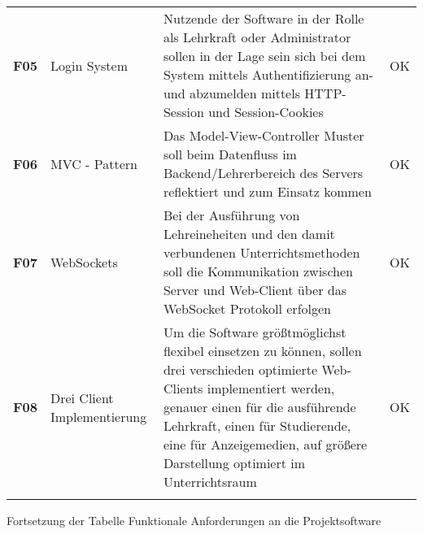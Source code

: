 \begin{table}[h!]
\begin{tabularx}{\textwidth}{clXc}
	\rowcolor[HTML]{FFFFFF}
	\textbf{F05}         & Login System                                              & Nutzende der Software in der Rolle als Lehrkraft oder Administrator sollen in der Lage sein sich bei dem System mittels Authentifizierung an- und abzumelden mittels HTTP-Session und Session-Cookies                                                                                 & OK              \\
	\rowcolor[HTML]{EFEFEF}
	\textbf{F06}         & MVC - Pattern                                             & Das Model-View-Controller Muster soll beim Datenfluss im Backend/Lehrerbereich des Servers reflektiert und zum Einsatz kommen                                                                                                                                                         & OK              \\
	\rowcolor[HTML]{FFFFFF}
	\textbf{F07}         & WebSockets                                                & Bei der Ausführung von Lehreineheiten und den damit verbundenen Unterrichtsmethoden soll die Kommunikation zwischen Server und Web-Client über das WebSocket Protokoll erfolgen                                                                                                & OK              \\
	\rowcolor[HTML]{EFEFEF}
	\textbf{F08}         & Drei Client Implementierung                               & Um die Software größtmöglichst flexibel einsetzen zu können, sollen drei verschieden optimierte Web-Clients implementiert werden, genauer einen für die ausführende Lehrkraft, einen für Studierende, eine für Anzeigemedien, auf größere Darstellung optimiert im Unterrichtsraum & OK              \\
	\rowcolor[HTML]{FFFFFF}
	
                                     
	
	\end{tabularx}
	

\end{table}
	\newpage
	Fortsetzung der Tabelle Funktionale Anforderungen an die Projektsoftware
	\thispagestyle{empty}

